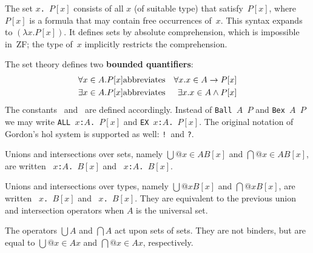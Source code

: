 The set \hbox{\tt{\ttlbrace}$x$.\ $P[x]${\ttrbrace}} consists of all $x$ (of
suitable type) that satisfy~$P[x]$, where $P[x]$ is a formula that may contain
free occurrences of~$x$.  This syntax expands to $(\lambda x.
P[x])$.  It defines sets by absolute comprehension, which is impossible in~ZF;
the type of~$x$ implicitly restricts the comprehension.

The set theory defines two {\bf bounded quantifiers}:
\begin{eqnarray*}
   \forall x\in A. P[x] &\hbox{abbreviates}& \forall x. x\in A\rightarrow P[x] \\
   \exists x\in A. P[x] &\hbox{abbreviates}& \exists x. x\in A\wedge P[x]
\end{eqnarray*}
The constants~ and~ are defined
accordingly.  Instead of \texttt{Ball $A$ $P$} and \texttt{Bex $A$ $P$} we may
write
%
\hbox{\tt ALL~$x$:$A$.\ $P[x]$} and \hbox{\tt EX~$x$:$A$.\ $P[x]$}.  The
original notation of Gordon's {\sc hol} system is supported as well:
\texttt{!}\ and \texttt{?}.

Unions and intersections over sets, namely $\bigcup@{x\in A}B[x]$ and
$\bigcap@{x\in A}B[x]$, are written 
~\hbox{\tt$x$:$A$.\ $B[x]$} and
~\hbox{\tt$x$:$A$.\ $B[x]$}.  

Unions and intersections over types, namely $\bigcup@x B[x]$ and $\bigcap@x
B[x]$, are written ~\hbox{\tt$x$.\ $B[x]$} and
~\hbox{\tt$x$.\ $B[x]$}.  They are equivalent to the previous
union and intersection operators when $A$ is the universal set.

The operators $\bigcup A$ and $\bigcap A$ act upon sets of sets.  They are
not binders, but are equal to $\bigcup@{x\in A}x$ and $\bigcap@{x\in A}x$,
respectively.



